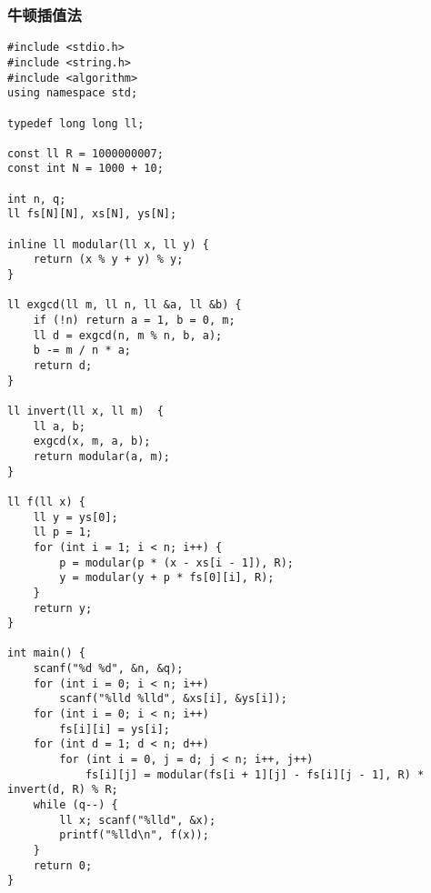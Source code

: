 \subsubsection{牛顿插值法}
\begin{verbatim}
#include <stdio.h>
#include <string.h>
#include <algorithm>
using namespace std;

typedef long long ll;

const ll R = 1000000007;
const int N = 1000 + 10;

int n, q;
ll fs[N][N], xs[N], ys[N];

inline ll modular(ll x, ll y) {
    return (x % y + y) % y;
}

ll exgcd(ll m, ll n, ll &a, ll &b) { 
    if (!n) return a = 1, b = 0, m;
    ll d = exgcd(n, m % n, b, a);
    b -= m / n * a;
    return d;
}

ll invert(ll x, ll m)  { 
    ll a, b;
    exgcd(x, m, a, b);
    return modular(a, m);
}

ll f(ll x) {
    ll y = ys[0];
    ll p = 1;
    for (int i = 1; i < n; i++) {
        p = modular(p * (x - xs[i - 1]), R);
        y = modular(y + p * fs[0][i], R);
    }
    return y;
}

int main() {
    scanf("%d %d", &n, &q);
    for (int i = 0; i < n; i++)
        scanf("%lld %lld", &xs[i], &ys[i]);
    for (int i = 0; i < n; i++)
        fs[i][i] = ys[i];
    for (int d = 1; d < n; d++)
        for (int i = 0, j = d; j < n; i++, j++)
            fs[i][j] = modular(fs[i + 1][j] - fs[i][j - 1], R) * invert(d, R) % R;
    while (q--) {
        ll x; scanf("%lld", &x);
        printf("%lld\n", f(x));
    }
    return 0;
}
\end{verbatim}
